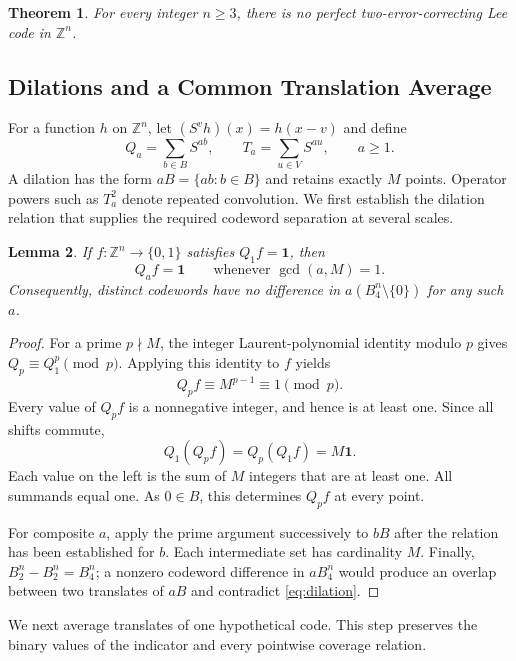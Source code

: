 \documentclass[12pt,letterpaper,onecolumn]{article}
\newtheorem{theorem}{Theorem}[section]
\newtheorem{lemma}[theorem]{Lemma}
\theoremstyle{definition}
\newcommand{\Z}{\mathbb{Z}}
\newcommand{\one}{\mathbf{1}}
\begin{document}
\begin{theorem}\label{thm:main}
For every integer $n\ge3$, there is no perfect two-error-correcting Lee code in $\Z^n$.
\end{theorem}

\subsection{Dilations and a Common Translation Average}
For a function $h$ on $\Z^n$, let $(S^vh)(x)=h(x-v)$ and define
\begin{equation}\label{eq:operators}
 Q_a=\sum_{b\in B}S^{ab},\qquad
 T_a=\sum_{u\in V}S^{au},\qquad a\ge1.
\end{equation}
A dilation has the form $aB=\{ab:b\in B\}$ and retains exactly $M$ points. Operator powers such as $T_a^2$ denote repeated convolution. We first establish the dilation relation that supplies the required codeword separation at several scales.

\begin{lemma}\label{lem:dilation}
If $f:\Z^n\to\{0,1\}$ satisfies $Q_1f=\one$, then
\begin{equation}\label{eq:dilation}
 Q_af=\one\qquad\text{whenever }\gcd(a,M)=1.
\end{equation}
Consequently, distinct codewords have no difference in $a(B_4^n\setminus\{0\})$ for any such $a$.
\end{lemma}
\begin{proof}
For a prime $p\nmid M$, the integer Laurent-polynomial identity modulo $p$ gives $Q_p\equiv Q_1^p\pmod p$. Applying this identity to $f$ yields
\begin{equation}\label{eq:frobenius-q}
 Q_pf\equiv M^{p-1}\equiv1\pmod p.
\end{equation}
Every value of $Q_pf$ is a nonnegative integer, and hence is at least one. Since all shifts commute,
\[
 Q_1(Q_pf)=Q_p(Q_1f)=M\one.
\]
Each value on the left is the sum of $M$ integers that are at least one. All summands equal one. As $0\in B$, this determines $Q_pf$ at every point.

For composite $a$, apply the prime argument successively to $bB$ after the relation has been established for $b$. Each intermediate set has cardinality $M$. Finally, $B_2^n-B_2^n=B_4^n$; a nonzero codeword difference in $aB_4^n$ would produce an overlap between two translates of $aB$ and contradict \eqref{eq:dilation}.
\end{proof}

We next average translates of one hypothetical code. This step preserves the binary values of the indicator and every pointwise coverage relation.
\end{document}
